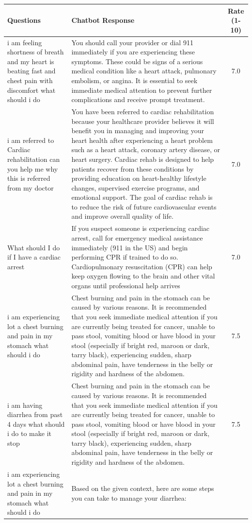     \begin{longtable}{|p{3.5cm}|p{9.1cm}|c|}
        \hline
        \textbf{Questions} & \textbf{Chatbot Response} & \textbf{Rate (1-10)} \\ 
        \hline
         i am feeling shortness of breath and my heart is beating fast and chest pain with discomfort what should i do & You should call your provider or dial 911 immediately if you are experiencing these symptoms. These could be signs of a serious medical condition like a heart attack, pulmonary embolism, or angina. It is essential to seek immediate medical attention to prevent further complications and receive prompt treatment. & 7.0 \\ 
        \hline
         i am referred to Cardiac rehabilitation can you help me
        why this is referred from my doctor & You have been referred to cardiac rehabilitation because your healthcare provider believes it will benefit you in managing and improving your heart health after experiencing a heart problem such as a heart attack, coronary artery disease, or heart surgery. Cardiac rehab is designed to help patients recover from these conditions by providing education on heart-healthy lifestyle changes, supervised exercise programs, and emotional support. The goal of cardiac rehab is to reduce the risk of future cardiovascular events and improve overall quality of life. & 7.0 \\ 
        \hline
         What should I do if I have a cardiac arrest &If you suspect someone is experiencing cardiac arrest, call for emergency medical assistance immediately (911 in the US) and begin performing CPR if trained to do so. Cardiopulmonary resuscitation (CPR) can help keep oxygen flowing to the brain and other vital organs until professional help arrives & 7.0 \\ 
        \hline
         i am experiencing lot a chest burning and pain in my stomach what should i do & Chest burning and pain in the stomach can be caused by various reasons. It is recommended that you seek immediate medical attention if you are currently being treated for cancer, unable to pass stool, vomiting blood or have blood in your stool (especially if bright red, maroon or dark, tarry black), experiencing sudden, sharp abdominal pain, have tenderness in the belly or rigidity and hardness of the abdomen.
         & 7.5 \\ 
        \hline
         i am having diarrhea  from past 4 days what should i do to make it stop & Chest burning and pain in the stomach can be caused by various reasons. It is recommended that you seek immediate medical attention if you are currently being treated for cancer, unable to pass stool, vomiting blood or have blood in your stool (especially if bright red, maroon or dark, tarry black), experiencing sudden, sharp abdominal pain, have tenderness in the belly or rigidity and hardness of the abdomen.
         & 7.5 \\ 
        \hline
         i am experiencing lot a chest burning and pain in my stomach what should i do &  Based on the given context, here are some steps you can take to manage your diarrhea:
        

\end{longtable}
